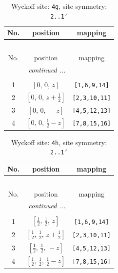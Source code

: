 \documentclass[fleqn,8pt]{jsarticle}
\begin{document}
\begin{longtable}{ccc}
\caption{Wyckoff site: {\tt 4g}, site symmetry: {\tt 2..1'}}
 \\
 \hline \hline
No. & position & mapping \\ \hline \endfirsthead

\multicolumn{2}{l}{\tablename\ \thetable{}} \\
 \hline \hline
No. & position & mapping \\ \hline \endhead

 \hline \hline
\multicolumn{2}{r}{\footnotesize\it continued ...} \\ \endfoot

 \hline \hline
\multicolumn{2}{r}{} \\ \endlastfoot

1 & $\left[ 0,\, 0,\, z \right]$ & {\tt [1,6,9,14]} \\ \hline
2 & $\left[ 0,\, 0,\, z + \frac{1}{2} \right]$ & {\tt [2,3,10,11]} \\ \hline
3 & $\left[ 0,\, 0,\, - z \right]$ & {\tt [4,5,12,13]} \\ \hline
4 & $\left[ 0,\, 0,\, \frac{1}{2} - z \right]$ & {\tt [7,8,15,16]} \\
\end{longtable}
\renewcommand{\arraystretch}{1.2}
\begin{longtable}{ccc}
\caption{Wyckoff site: {\tt 4h}, site symmetry: {\tt 2..1'}}
 \\
 \hline \hline
No. & position & mapping \\ \hline \endfirsthead

\multicolumn{2}{l}{\tablename\ \thetable{}} \\
 \hline \hline
No. & position & mapping \\ \hline \endhead

 \hline \hline
\multicolumn{2}{r}{\footnotesize\it continued ...} \\ \endfoot

 \hline \hline
\multicolumn{2}{r}{} \\ \endlastfoot

1 & $\left[ \frac{1}{2},\, \frac{1}{2},\, z \right]$ & {\tt [1,6,9,14]} \\ \hline
2 & $\left[ \frac{1}{2},\, \frac{1}{2},\, z + \frac{1}{2} \right]$ & {\tt [2,3,10,11]} \\ \hline
3 & $\left[ \frac{1}{2},\, \frac{1}{2},\, - z \right]$ & {\tt [4,5,12,13]} \\ \hline
4 & $\left[ \frac{1}{2},\, \frac{1}{2},\, \frac{1}{2} - z \right]$ & {\tt [7,8,15,16]} \\
\end{longtable}
\end{document}
